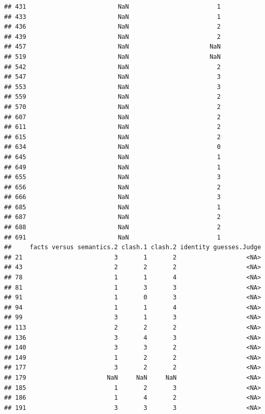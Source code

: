 \documentclass[
]{article}
\begin{document}
\begin{verbatim}
## 431                         NaN                        1
## 433                         NaN                        1
## 436                         NaN                        2
## 439                         NaN                        2
## 457                         NaN                      NaN
## 519                         NaN                      NaN
## 542                         NaN                        2
## 547                         NaN                        3
## 553                         NaN                        3
## 559                         NaN                        2
## 570                         NaN                        2
## 607                         NaN                        2
## 611                         NaN                        2
## 615                         NaN                        2
## 634                         NaN                        0
## 645                         NaN                        1
## 649                         NaN                        1
## 655                         NaN                        3
## 656                         NaN                        2
## 666                         NaN                        3
## 685                         NaN                        1
## 687                         NaN                        2
## 688                         NaN                        2
## 691                         NaN                        1
##     facts versus semantics.2 clash.1 clash.2 identity guesses.Judge
## 21                         3       1       2                   <NA>
## 43                         2       2       2                   <NA>
## 78                         1       1       4                   <NA>
## 81                         1       3       3                   <NA>
## 91                         1       0       3                   <NA>
## 94                         1       1       4                   <NA>
## 99                         3       1       3                   <NA>
## 113                        2       2       2                   <NA>
## 136                        3       4       3                   <NA>
## 140                        3       3       2                   <NA>
## 149                        1       2       2                   <NA>
## 177                        3       2       2                   <NA>
## 179                      NaN     NaN     NaN                   <NA>
## 185                        1       2       3                   <NA>
## 186                        1       4       2                   <NA>
## 191                        3       3       3                   <NA>

\end{verbatim}
\end{document}
